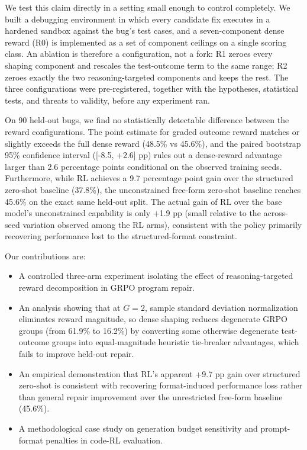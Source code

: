 \documentclass{article}
\begin{document}
We test this claim directly in a setting small enough to control completely. We built a debugging environment in which every candidate fix executes in a hardened sandbox against the bug's test cases, and a seven-component dense reward (R0) is implemented as a set of component ceilings on a single scoring class. An ablation is therefore a configuration, not a fork: R1 zeroes every shaping component and rescales the test-outcome term to the same range; R2 zeroes exactly the two reasoning-targeted components and keeps the rest. The three configurations were pre-registered, together with the hypotheses, statistical tests, and threats to validity, before any experiment ran.

On 90 held-out bugs, we find no statistically detectable difference between the reward configurations. The point estimate for graded outcome reward matches or slightly exceeds the full dense reward (48.5\% vs 45.6\%), and the paired bootstrap 95\% confidence interval ([-8.5, +2.6] pp) rules out a dense-reward advantage larger than 2.6 percentage points conditional on the observed training seeds. Furthermore, while RL achieves a 9.7 percentage point gain over the structured zero-shot baseline (37.8\%), the unconstrained free-form zero-shot baseline reaches 45.6\% on the exact same held-out split. The actual gain of RL over the base model's unconstrained capability is only +1.9 pp (small relative to the across-seed variation observed among the RL arms), consistent with the policy primarily recovering performance lost to the structured-format constraint.

Our contributions are:
\begin{itemize}
\item A controlled three-arm experiment isolating the effect of reasoning-targeted reward decomposition in GRPO program repair.
\item An analysis showing that at $G=2$, sample standard deviation normalization eliminates reward magnitude, so dense shaping reduces degenerate GRPO groups (from 61.9\% to 16.2\%) by converting some otherwise degenerate test-outcome groups into equal-magnitude heuristic tie-breaker advantages, which fails to improve held-out repair.
\item An empirical demonstration that RL's apparent +9.7 pp gain over structured zero-shot is consistent with recovering format-induced performance loss rather than general repair improvement over the unrestricted free-form baseline (45.6\%).
\item A methodological case study on generation budget sensitivity and prompt-format penalties in code-RL evaluation.
\end{itemize}
\end{document}
